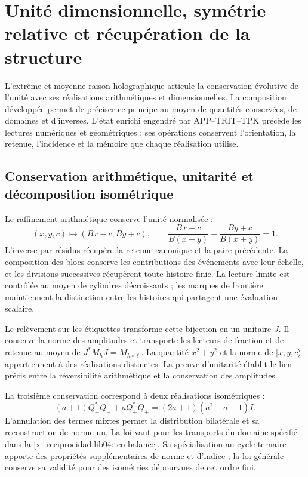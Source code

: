 \chapter{Unité dimensionnelle, symétrie relative et récupération de la structure}
\label{x_reciprocidad:lib06:sintesis}

L’extrême et moyenne raison holographique articule la conservation évolutive
de l’unité avec ses réalisations arithmétiques et dimensionnelles. La
composition développée permet de préciser ce principe au moyen de
quantités conservées, de domaines et d’inverses. L’état enrichi
engendré par APP--TRIT--TPK précède les lectures numériques et
géométriques ; ses opérations conservent l’orientation, la retenue,
l’incidence et la mémoire que chaque réalisation utilise.

\section{Conservation arithmétique, unitarité et décomposition isométrique}
\label{x_reciprocidad:lib06:tres-conservaciones}

Le raffinement arithmétique conserve l'unité normalisée :
\begin{equation}
 (x,y,c)\longmapsto(Bx-c,By+c),\qquad
 \frac{Bx-c}{B(x+y)}+\frac{By+c}{B(x+y)}=1.
 \label{x_reciprocidad:lib06:unidad}
\end{equation}
L'inverse par résidus récupère la retenue canonique et la paire précédente. La composition des blocs conserve les contributions des événements avec leur échelle, et les divisions successives récupèrent toute histoire finie. La lecture limite est contrôlée au moyen de cylindres décroissants ; les marques de frontière maintiennent la distinction entre les histoires qui partagent une évaluation scalaire.

Le relèvement sur les étiquettes transforme cette bijection en un
unitaire \(J\). Il conserve la norme des amplitudes et transporte
les lecteurs de fraction et de retenue au moyen de
\(J^*M_hJ=M_{h\circ\ell}\). La quantité \(x^2+y^2\) et la norme
de \(|x,y,c\rangle\) appartiennent à des réalisations distinctes. La
preuve d’unitarité établit le lien précis entre la
réversibilité arithmétique et la conservation des amplitudes.

La troisième conservation correspond à deux réalisations isométriques :
\begin{equation}
 (a+1)Q_-^*Q_-+aQ_+^*Q_+
 =(2a+1)(a^2+a+1)I.
 \label{x_reciprocidad:lib06:balance}
\end{equation}
L’annulation des termes mixtes permet la distribution
bilatérale et sa reconstruction de norme un. La loi vaut pour les
transports du domaine spécifié dans la
\cref{x_reciprocidad:lib04:teo-balance}. Sa spécialisation au cycle ternaire
apporte des propriétés supplémentaires de norme et d’indice ; la loi générale
conserve sa validité pour des isométries dépourvues de cet ordre fini.

